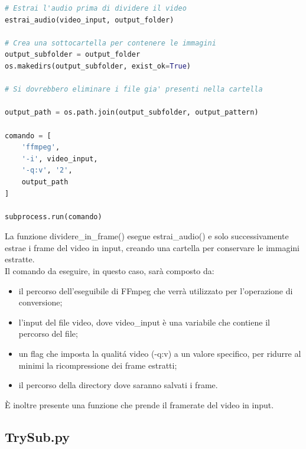\documentclass{report}
\begin{document}
\begin{lstlisting}[language=Python, breaklines=true]
# Estrai l'audio prima di dividere il video
estrai_audio(video_input, output_folder)

# Crea una sottocartella per contenere le immagini
output_subfolder = output_folder
os.makedirs(output_subfolder, exist_ok=True)

# Si dovrebbero eliminare i file gia' presenti nella cartella

output_path = os.path.join(output_subfolder, output_pattern)

comando = [
    'ffmpeg',
    '-i', video_input,
    '-q:v', '2',
    output_path
]

subprocess.run(comando)

\end{lstlisting}
La funzione dividere\_in\_frame() esegue estrai\_audio() e solo successivamente estrae i frame del video in input, creando una cartella per conservare le immagini estratte. \\
Il comando da eseguire, in questo caso, sarà composto da: \\
\begin{itemize}
        \item
        il percorso dell'eseguibile di FFmpeg che verrà utilizzato per l'operazione di conversione;
        \item
        l’input del file video, dove video\_input è una variabile che contiene il percorso del file;
  \item
        un flag che imposta la qualitá video (-q:v) a un valore specifico, per ridurre al minimi la ricompressione dei frame estratti;
  \item
        il percorso della directory dove saranno salvati i frame.
\end{itemize}

È inoltre presente una funzione che prende il framerate del video in input.

\subsection{TrySub.py}
\end{document}

